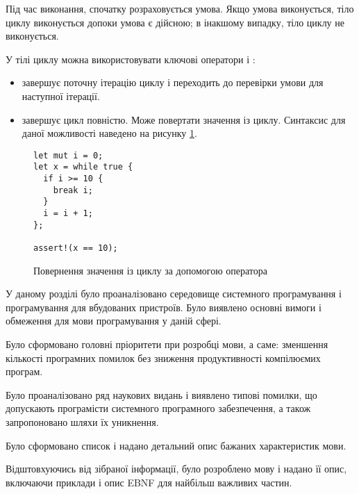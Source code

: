\documentclass[main.tex]{subfiles}
\begin{document}
Під час виконання, спочатку розраховується умова. Якщо умова виконується, тіло циклу виконується допоки умова є дійсною; в інакшому випадку, тіло циклу не виконується.

У тілі циклу можна використовувати ключові оператори  і :
\begin{itemize}[nosep]
\item {} завершує поточну ітерацію циклу і переходить до перевірки умови для наступної ітерації.
\item {} завершує цикл повністю. Може повертати значення із циклу. Синтаксис для даної можливості наведено на рисунку \ref{lang:break-value}.
\end{itemize}

\begin{figure}[h]
  \centering
  \begin{verbatim}
let mut i = 0;
let x = while true {
  if i >= 10 {
    break i;
  }
  i = i + 1;
};

assert!(x == 10);
  \end{verbatim}
  \caption{Повернення значення із циклу за допомогою оператора }
  \label{lang:break-value}
\end{figure}

\chapterconslusions{}
У даному розділі було проаналізовано середовище системного програмування і програмування для вбудованих пристроїв.
Було виявлено основні вимоги і обмеження для мови програмування у даній сфері.

Було сформовано головні пріоритети при розробці мови, а саме: зменшення кількості програмних помилок без зниження продуктивності компілюємих програм.

Було проаналізовано ряд наукових видань і виявлено типові помилки, що допускають програмісти системного програмного забезпечення, а також запропоновано шляхи їх уникнення.

Було сформовано список і надано детальний опис бажаних характеристик мови.

Відштовхуючись від зібраної інформації, було розроблено мову і надано її опис, включаючи приклади і опис EBNF для найбільш важливих частин.

\end{document}
